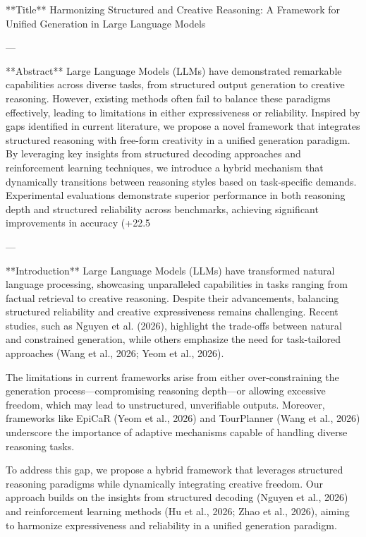 **Title**  
Harmonizing Structured and Creative Reasoning: A Framework for Unified Generation in Large Language Models  

---

**Abstract**  
Large Language Models (LLMs) have demonstrated remarkable capabilities across diverse tasks, from structured output generation to creative reasoning. However, existing methods often fail to balance these paradigms effectively, leading to limitations in either expressiveness or reliability. Inspired by gaps identified in current literature, we propose a novel framework that integrates structured reasoning with free-form creativity in a unified generation paradigm. By leveraging key insights from structured decoding approaches and reinforcement learning techniques, we introduce a hybrid mechanism that dynamically transitions between reasoning styles based on task-specific demands. Experimental evaluations demonstrate superior performance in both reasoning depth and structured reliability across benchmarks, achieving significant improvements in accuracy (+22.5%

---

**Introduction**  
Large Language Models (LLMs) have transformed natural language processing, showcasing unparalleled capabilities in tasks ranging from factual retrieval to creative reasoning. Despite their advancements, balancing structured reliability and creative expressiveness remains challenging. Recent studies, such as Nguyen et al. (2026), highlight the trade-offs between natural and constrained generation, while others emphasize the need for task-tailored approaches (Wang et al., 2026; Yeom et al., 2026). 

The limitations in current frameworks arise from either over-constraining the generation process—compromising reasoning depth—or allowing excessive freedom, which may lead to unstructured, unverifiable outputs. Moreover, frameworks like EpiCaR (Yeom et al., 2026) and TourPlanner (Wang et al., 2026) underscore the importance of adaptive mechanisms capable of handling diverse reasoning tasks.

To address this gap, we propose a hybrid framework that leverages structured reasoning paradigms while dynamically integrating creative freedom. Our approach builds on the insights from structured decoding (Nguyen et al., 2026) and reinforcement learning methods (Hu et al., 2026; Zhao et al., 2026), aiming to harmonize expressiveness and reliability in a unified generation paradigm.

